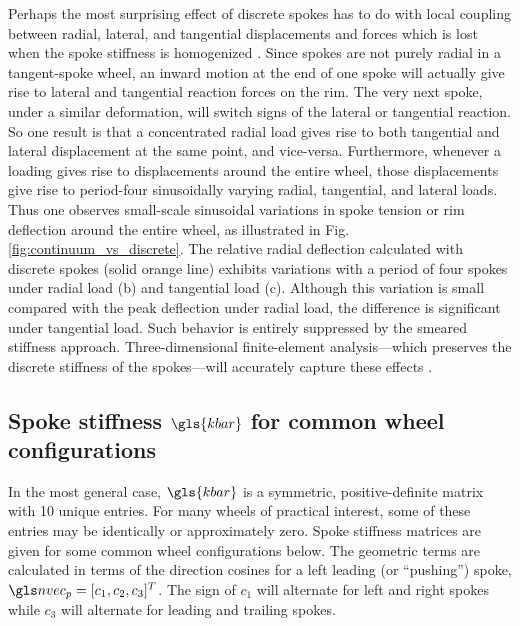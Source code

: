 \documentclass[\rootdir/thesis.tex]{subfiles}
\begin{document}
Perhaps the most surprising effect of discrete spokes has to do with local coupling between radial, lateral, and tangential displacements and forces which is lost when the spoke stiffness is homogenized \cite{PapadopoulosPriv}. Since spokes are not purely radial in a tangent-spoke wheel, an inward motion at the end of one spoke will actually give rise to lateral and tangential reaction forces on the rim. The very next spoke, under a similar deformation, will switch signs of the lateral or tangential reaction. So one result is that a concentrated radial load gives rise to both tangential and lateral displacement at the same point, and vice-versa. Furthermore, whenever a loading gives rise to displacements around the entire wheel, those displacements give rise to period-four sinusoidally varying radial, tangential, and lateral loads. Thus one observes small-scale sinusoidal variations in spoke tension or rim deflection around the entire wheel, as illustrated in Fig. \ref{fig:continuum_vs_discrete}. The relative radial deflection calculated with discrete spokes (solid orange line) exhibits variations with a period of four spokes under radial load (b) and tangential load (c). Although this variation is small compared with the peak deflection under radial load, the difference is significant under tangential load. Such behavior is entirely suppressed by the smeared stiffness approach. Three-dimensional finite-element analysis---which preserves the discrete stiffness of the spokes---will accurately capture these effects \cite{Salamon1992}.

\subsection{Spoke stiffness $\gls{kbar}$ for common wheel configurations}

In the most general case, $\gls{kbar}$ is a symmetric, positive-definite matrix with 10 unique entries. For many wheels of practical interest, some of these entries may be identically or approximately zero. Spoke stiffness matrices are given for some common wheel configurations below. The geometric terms are calculated in terms of the direction cosines for a left leading (or ``pushing'') spoke, $\n_p = [c_1, c_2, c_3]^T$. The sign of $c_1$ will alternate for left and right spokes while $c_3$ will alternate for leading and trailing spokes.
\end{document}
